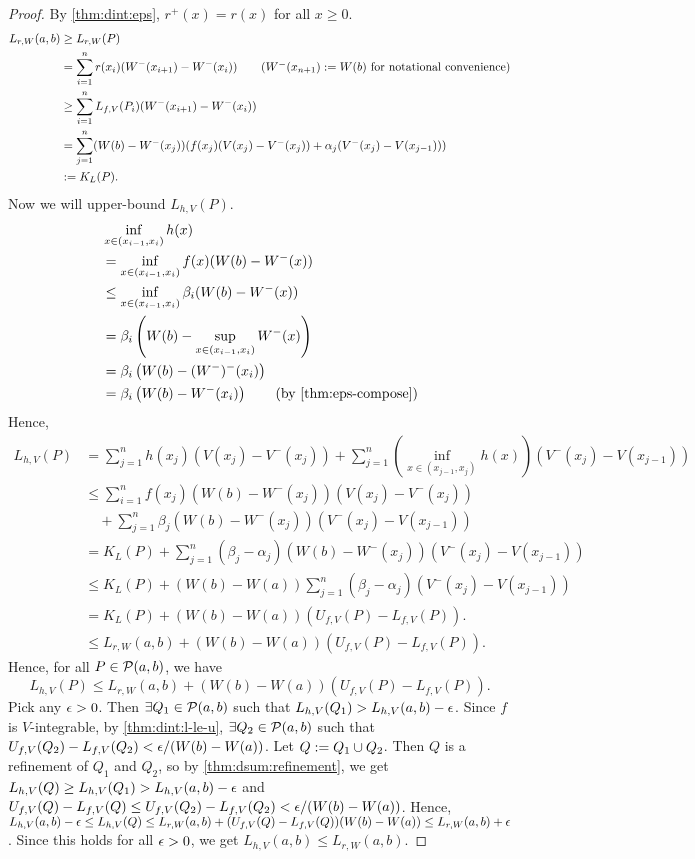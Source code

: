 \documentclass[a4paper,12pt,fleqn]{article}
\begin{document}
\begin{proof}
By \cref{thm:dint:eps}, $r^+(x) = r(x)$ for all $x \ge 0$.
\begin{align*}
L_{r,W}(a, b) &\ge L_{r,W}(P)
\\ &= \sum_{i=1}^n r(x_i)(W^-(x_{i+1})-W^-(x_i))
    \tag{$W^-(x_{n+1}) \defeq W(b)$ for notational convenience}
\\ &\ge \sum_{i=1}^n L_{f,V}(P_i)(W^-(x_{i+1})-W^-(x_i))
\\ &= \sum_{j=1}^n (W(b)-W^-(x_j))(f(x_j)(V(x_j)-V^-(x_j)) + \alpha_j(V^-(x_j)-V(x_{j-1})))
\\ &\defeq K_L(P).
\end{align*}
Now we will upper-bound $L_{h,V}(P)$.
\begin{align*}
& \inf_{x \in (x_{i-1}, x_i)} h(x)
\\ &= \inf_{x \in (x_{i-1}, x_i)} f(x)(W(b)-W^-(x))
\\ &\le \inf_{x \in (x_{i-1}, x_i)} \beta_i(W(b)-W^-(x))
\\ &= \beta_i\left(W(b) - \sup_{x \in (x_{i-1}, x_i)} W^-(x)\right)
\\ &= \beta_i\left(W(b) - (W^-)^-(x_i)\right)
\\ &= \beta_i\left(W(b) - W^-(x_i)\right)
    \tag{by \cref{thm:eps-compose}}
\end{align*}
Hence,
\begin{align*}
L_{h,V}(P) &= \sum_{j=1}^n h(x_j)(V(x_j)-V^-(x_j))
    + \sum_{j=1}^n \left(\inf_{x \in (x_{j-1}, x_j)} h(x)\right)(V^-(x_j)-V(x_{j-1}))
\\ &\le \sum_{i=1}^n f(x_j)(W(b)-W^-(x_j))(V(x_j)-V^-(x_j))
    \\ &\quad+ \sum_{j=1}^n \beta_j(W(b)-W^-(x_j))(V^-(x_j)-V(x_{j-1}))
\\ &= K_L(P) + \sum_{j=1}^n (\beta_j - \alpha_j)(W(b)-W^-(x_j))(V^-(x_j)-V(x_{j-1}))
\\ &\le K_L(P) + (W(b)-W(a))\sum_{j=1}^n (\beta_j - \alpha_j)(V^-(x_j)-V(x_{j-1}))
\\ &= K_L(P) + (W(b)-W(a))(U_{f,V}(P) - L_{f,V}(P)).
\\ &\le L_{r,W}(a, b) + (W(b)-W(a))(U_{f,V}(P) - L_{f,V}(P)).
\end{align*}
Hence, for all $P \in \mathcal{P}(a, b)$, we have
\[ L_{h,V}(P) \le L_{r,W}(a, b) + (W(b)-W(a))(U_{f,V}(P) - L_{f,V}(P)). \]
Pick any $\epsilon > 0$. Then $\exists Q_1 \in \mathcal{P}(a, b)$
such that $L_{h,V}(Q_1) > L_{h,V}(a, b) - \epsilon$.
Since $f$ is $V$-integrable, by \cref{thm:dint:l-le-u}, $\exists Q_2 \in \mathcal{P}(a, b)$
such that $U_{f,V}(Q_2) - L_{f,V}(Q_2) < \epsilon/(W(b)-W(a))$.
Let $Q := Q_1 \cup Q_2$. Then $Q$ is a refinement of $Q_1$ and $Q_2$,
so by \cref{thm:dsum:refinement}, we get $L_{h,V}(Q) \ge L_{h,V}(Q_1) > L_{h,V}(a, b) - \epsilon$
and $U_{f,V}(Q) - L_{f,V}(Q) \le U_{f,V}(Q_2) - L_{f,V}(Q_2) < \epsilon/(W(b)-W(a))$.
Hence, $L_{h,V}(a, b) - \epsilon \le L_{h,V}(Q) \le L_{r,W}(a, b) + (U_{f,V}(Q)-L_{f,V}(Q))(W(b)-W(a))
\le L_{r,W}(a, b) + \epsilon$. Since this holds for all $\epsilon > 0$,
we get $L_{h,V}(a, b) \le L_{r,W}(a, b)$.


\end{proof}
\end{document}
